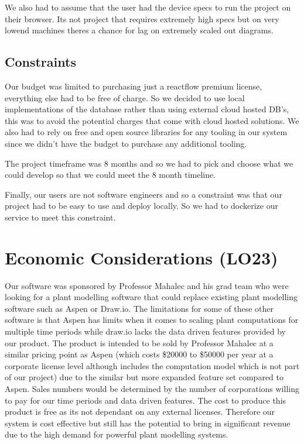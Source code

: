 \documentclass{article}
\begin{document}
We also had to assume that the user had the device specs to run the project on their browser. Its not project that requires extremely high specs but on very lowend machines theres a chance for lag on extremely scaled out diagrams. 

\subsection{Constraints}
Our budget was limited to purchasing just a reactflow premium license, everything else had to be free of charge. So we decided to use local implementations of the database rather than using external cloud hosted DB's, this was to avoid the potential charges that come with cloud hosted solutions. We also had to rely on free and open source libraries for any tooling in our system since we didn't have the budget to purchase any additional tooling.

The project timeframe was 8 months and so we had to pick and choose what we could develop so that we could meet the 8 month timeline.

Finally, our users are not software engineers and so a constraint was that our project had to be easy to use and deploy locally. So we had to dockerize our service to meet this constraint.  
 

\section{Economic Considerations (LO23)}


Our software was sponsored by Professor Mahalec and his grad team who were looking for a plant modelling software that could replace existing plant modelling software such as Aspen or Draw.io. The limitations for some of these other software is that Aspen has limits when it comes to scaling plant computations for multiple time periods while draw.io lacks the data driven features provided by our product. The product is intended to be sold by Professor Mahalec at a similar pricing point as Aspen (which costs \$20000 to \$50000 per year at a corporate license level although includes the computation model which is not part of our project) due to the similar but more expanded feature set compared to Aspen. Sales numbers would be determined by the number of corporations willing to pay for our time periods and data driven features. The cost to produce this product is free as its not dependant on any external licenses. Therefore our system is cost effective but still has the potential to bring in significant revenue due to the high demand  for powerful plant modelling systems. 
\end{document}
